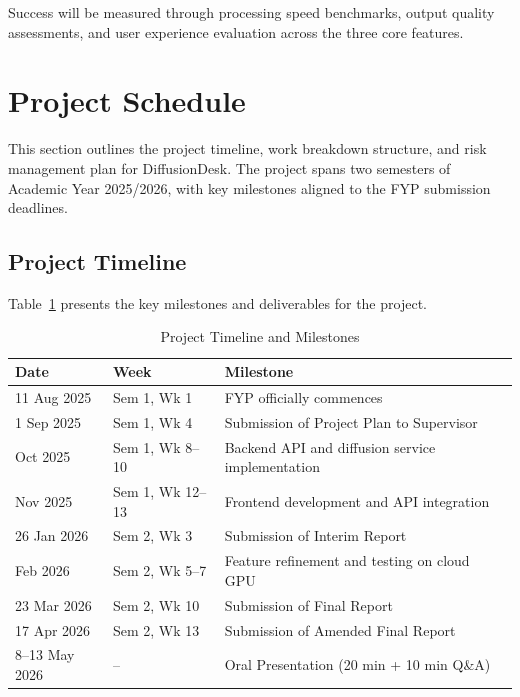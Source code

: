 \documentclass[12pt,a4paper]{report}
\begin{document}
Success will be measured through processing speed benchmarks, output quality assessments, and user experience evaluation across the three core features.

\newpage

\section{Project Schedule}

This section outlines the project timeline, work breakdown structure, and risk management plan for DiffusionDesk. The project spans two semesters of Academic Year 2025/2026, with key milestones aligned to the FYP submission deadlines.

\subsection{Project Timeline}

Table~\ref{tab:timeline} presents the key milestones and deliverables for the project.

\begin{table}[H]
\centering
\caption{Project Timeline and Milestones}
\label{tab:timeline}
\renewcommand{\arraystretch}{1.3}
\begin{tabular}{|p{3cm}|p{3cm}|p{7.5cm}|}
\hline
\textbf{Date} & \textbf{Week} & \textbf{Milestone} \\
\hline
11 Aug 2025 & Sem 1, Wk 1 & FYP officially commences \\
\hline
1 Sep 2025 & Sem 1, Wk 4 & Submission of Project Plan to Supervisor \\
\hline
Oct 2025 & Sem 1, Wk 8--10 & Backend API and diffusion service implementation \\
\hline
Nov 2025 & Sem 1, Wk 12--13 & Frontend development and API integration \\
\hline
26 Jan 2026 & Sem 2, Wk 3 & Submission of Interim Report \\
\hline
Feb 2026 & Sem 2, Wk 5--7 & Feature refinement and testing on cloud GPU \\
\hline
23 Mar 2026 & Sem 2, Wk 10 & Submission of Final Report \\
\hline
17 Apr 2026 & Sem 2, Wk 13 & Submission of Amended Final Report \\
\hline
8--13 May 2026 & -- & Oral Presentation (20 min + 10 min Q\&A) \\
\hline
\end{tabular}
\end{table}
\end{document}
